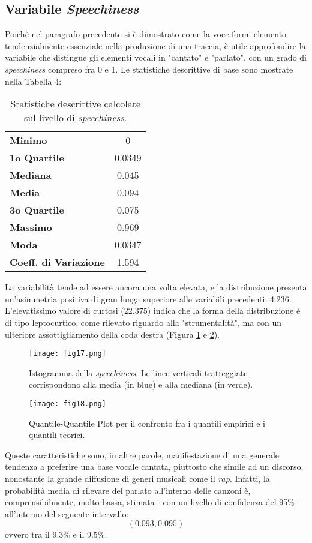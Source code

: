 \documentclass[fleqn,10pt]{SelfArx} %
\begin{document}
\subsection*{Variabile \textit{Speechiness}}
Poichè nel paragrafo precedente si è dimostrato come la voce formi elemento tendenzialmente essenziale nella produzione di una traccia, è utile approfondire la variabile che distingue gli elementi vocali in "cantato" e "parlato", con un grado di \textit{speechiness} compreso fra 0 e 1. Le statistiche descrittive di base sono mostrate nella Tabella 4:
{\begin{table}[H]
\centering

\begin{tabular}[t]{lc}
\toprule
\midrule
\textbf{Minimo}&0\\
\textbf{1o Quartile}&0.0349\\
\textbf{Mediana}&0.045\\
\textbf{Media}&0.094\\
\textbf{3o Quartile}&0.075\\
\textbf{Massimo}&0.969\\
\textbf{Moda}&0.0347\\
\textbf{Coeff. di Variazione}&1.594\\
\bottomrule
\end{tabular}
\caption{Statistiche descrittive calcolate sul livello di \textit{speechiness}.}
\end{table}}
La variabilità tende ad essere ancora una volta elevata, e la distribuzione presenta un'asimmetria positiva di gran lunga superiore alle variabili precedenti: 4.236. L'elevatissimo valore di curtosi (22.375) indica che la forma della distribuzione è di tipo leptocurtico, come rilevato riguardo alla "strumentalità", ma con un ulteriore assottigliamento della coda destra (Figura \ref{fig:fig17} e \ref{fig:fig18}).
\begin{figure}[H]
    \centering
    \texttt{[image: fig17.png]}
    \caption{Istogramma della \textit{speechiness}. Le linee verticali tratteggiate corrispondono alla media (in blue) e alla mediana (in verde).}
    \label{fig:fig17}
\end{figure}
\begin{figure}[H]
    \centering
    \texttt{[image: fig18.png]}
    \caption{Quantile-Quantile Plot per il confronto fra i quantili empirici e i quantili teorici.}
    \label{fig:fig18}
\end{figure}
Queste caratteristiche sono, in altre parole, manifestazione di una generale tendenza a preferire una base vocale cantata, piuttosto che simile ad un discorso, nonostante la grande diffusione di generi musicali come il \textit{rap}. Infatti, la probabilità media di rilevare del parlato all'interno delle canzoni è, comprensibilmente, molto bassa, stimata - con un livello di confidenza del 95\% - all'interno del seguente intervallo:
\begin{equation}
    (0.093, 0.095)
\end{equation}
ovvero tra il 9.3\% e il 9.5\%.
\end{document}
